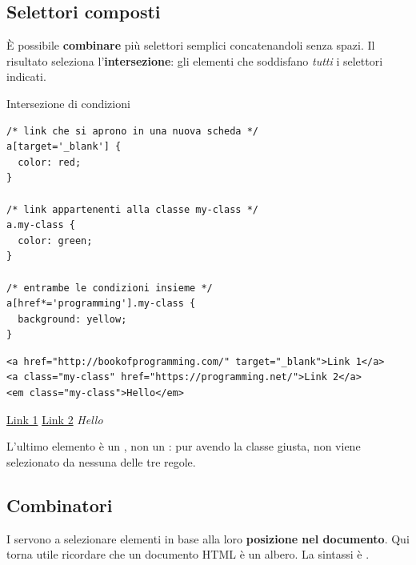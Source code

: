 \subsection{Selettori composti}

È possibile \textbf{combinare} più selettori semplici concatenandoli senza
spazi. Il risultato seleziona l'\textbf{intersezione}: gli elementi che
soddisfano \textit{tutti} i selettori indicati.

\begin{esempio}{Intersezione di condizioni}
\begin{affianco}[0.62]
\codicepiccolo
\begin{lstlisting}[style=css, name=composti.css]
/* link che si aprono in una nuova scheda */
a[target='_blank'] {
  color: red;
}

/* link appartenenti alla classe my-class */
a.my-class {
  color: green;
}

/* entrambe le condizioni insieme */
a[href*='programming'].my-class {
  background: yellow;
}
\end{lstlisting}
\begin{lstlisting}[style=html, name=composti.html]
<a href="http://bookofprogramming.com/" target="_blank">Link 1</a>
<a class="my-class" href="https://programming.net/">Link 2</a>
<em class="my-class">Hello</em>
\end{lstlisting}
\risultato
\begin{browser}
  \textcolor{css-red}{\uline{Link 1}}\quad
  \colorbox{css-yellow}{\textcolor{css-green}{\uline{Link 2}}}\quad
  \textit{Hello}
\end{browser}
\end{affianco}

L'ultimo elemento è un , non un : pur avendo la classe giusta, non
viene selezionato da nessuna delle tre regole.
\end{esempio}

\subsection{Combinatori}

I  servono a selezionare elementi in base alla loro
\textbf{posizione nel documento}. Qui torna utile ricordare che un documento
HTML è un albero. La sintassi è .

